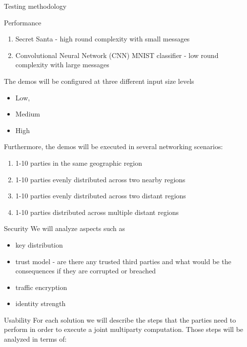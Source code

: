 \begin{frame}{Testing methodology}
\begin{block}{Performance}
\begin{enumerate}
\tightlist
\item
  Secret Santa - high round complexity with small messages
\item
  Convolutional Neural Network (CNN) MNIST classifier - low round
  complexity with large messages
\end{enumerate}

The demos will be configured at three different input size levels

\begin{itemize}
\tightlist
\item
  Low,
\item
  Medium
\item
  High
\end{itemize}

Furthermore, the demos will be executed in several networking scenarios:

\begin{enumerate}
\tightlist
\item
  1-10 parties in the same geographic region
\item
  1-10 parties evenly distributed across two nearby regions
\item
  1-10 parties evenly distributed across two distant regions
\item
  1-10 parties distributed across multiple distant regions
\end{enumerate}
\end{block}

\begin{block}{Security}
\protect\hypertarget{security}{}
We will analyze aspects such as

\begin{itemize}
\tightlist
\item
  key distribution
\item
  trust model - are there any trusted third parties and what would be
  the consequences if they are corrupted or breached
\item
  traffic encryption
\item
  identity strength
\end{itemize}
\end{block}

\begin{block}{Usability}
\protect\hypertarget{usability}{}
For each solution we will describe the steps that the parties need to
perform in order to execute a joint multiparty computation. Those steps
will be analyzed in terms of:


\end{block}
\end{frame}

